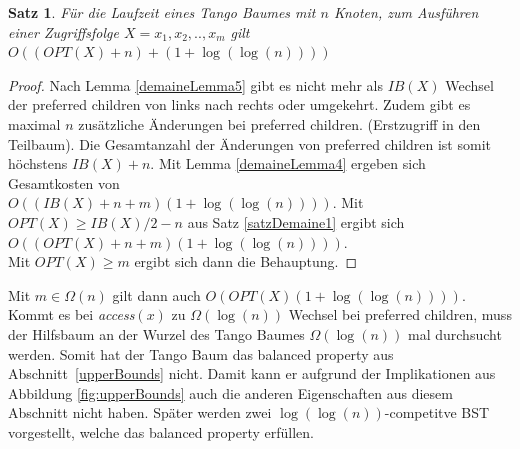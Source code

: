 \documentclass[a4paper,12pt]{article}
\newtheorem{Satz}{Satz}[section]
\begin{document}
\begin{Satz} \label{demaineSatz2}
	Für die Laufzeit eines Tango Baumes mit $n$ Knoten, zum Ausführen einer Zugriffsfolge $X = x_1, x_2,.., x_m$ gilt $O\left(\left(\mathit{OPT}\left(X\right) + n\right)  + \left(  1 + \log\left(\log \left(n\right)\right)\right)   \right)$
\end{Satz}
\begin{proof}
	Nach Lemma \ref{demaineLemma5} gibt es nicht mehr als  $\mathit{IB}\left(X\right)$ Wechsel der preferred children von links nach rechts oder umgekehrt. Zudem gibt es maximal $n$ zusätzliche Änderungen bei preferred children. (Erstzugriff in den Teilbaum). Die Gesamtanzahl der Änderungen von preferred children ist somit höchstens $\mathit{IB}\left(X\right) + n$. Mit Lemma \ref{demaineLemma4} ergeben sich Gesamtkosten von\\ $O\left(\left(\mathit{IB}\left(X\right) + n +m \right) \left( 1 + \log \left(\log\left(n\right)\right)\right) \right)$. Mit $\mathit{OPT}\left(X\right) \geq \mathit{IB}\left(X\right) /2 -n $ aus Satz \ref{satzDemaine1} ergibt sich 
	$O\left(\left(\mathit{OPT}\left(X\right) + n +m \right) \left( 1 + \log \left(\log\left(n\right)\right)\right) \right)$.\\ Mit $\mathit{OPT}\left(X\right) \geq m$ ergibt sich dann die Behauptung.
\end{proof}
\noindent Mit $m \in \Omega\left(n\right)$ gilt dann auch 
$O\left(	\mathit{OPT}\left(X\right) 	\left( 1 + \log \left(\log \left(n\right)\right)\right)	 \right)$.\\
 Kommt es bei \textit{access}$\left(x\right)$ zu $\Omega\left(\log\left(n\right)\right)$ Wechsel bei preferred children, muss der Hilfsbaum an der Wurzel des Tango Baumes $\Omega\left(\log\left(n\right)\right)$ mal durchsucht werden. Somit hat der Tango Baum das balanced property aus \mbox{Abschnitt \ref{upperBounds}} nicht. Damit kann er aufgrund der Implikationen aus Abbildung \ref{fig:upperBounds} auch die anderen Eigenschaften aus diesem Abschnitt nicht haben. Später werden zwei $\log\left(\log\left(n\right)\right)$-competitve BST vorgestellt, welche das balanced property erfüllen.      
\end{document}
